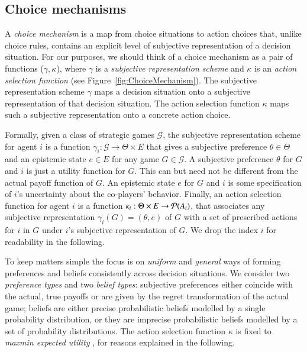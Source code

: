 \documentclass[fleqn,reqno,11pt]{article}
\begin{document}
\subsection{Choice mechanisms}
\label{sec:choice-mechanisms}

A \emph{choice mechanism} is a map from choice situations to action choices that, unlike choice
rules, contains an explicit level of subjective representation of a decision situation. For our
purposes, we should think of a choice mechanism as a pair of functions ($\gamma,\kappa$), where
$\gamma$ is a \emph{subjective representation scheme} and $\kappa$ is an \emph{action selection
  function} (see Figure~\ref{fig:ChoiceMechanism}). The subjective representation scheme
$\gamma$ maps a decision situation onto a subjective representation of that decision
situation. The action selection function $\kappa$ maps such a subjective representation onto a
concrete action choice. 



Formally, given a class of strategic games $\mathcal{G}$, the subjective representation scheme
for agent $i$ is a function $\gamma_i: \mathcal{G} \rightarrow \Theta \times E$ that gives a
subjective preference $\theta \in \Theta$ and an epistemic state $e \in E$ for any game
$G \in \mathcal{G}$. A subjective preference $\theta$ for $G$ and $i$ is just a utility
function for $G$. This can but need not be different from the actual payoff function of $G$. An
epistemic state $e$ for $G$ and $i$ is some specification of $i$'s uncertainty about the
co-players' behavior. Finally, an action selection function for agent $i$ is a function
$\kappa_i: \Theta \times E \rightarrow \mathcal{P}(A_i) $, that associates any subjective
representation $\gamma_i(G) = (\theta,e)$ of $G$ with a set of prescribed actions
for $i$ in $G$ under $i$'s subjective representation of $G$. We drop the index $i$ for
readability in the following.

To keep matters simple the focus is on \emph{uniform} and \emph{general} ways of forming
preferences and beliefs consistently across decision situations. We consider two
\emph{preference types} and two \emph{belief types}: subjective preferences either coincide
with the actual, true payoffs or are given by the regret transformation of the actual game;
beliefs are either precise probabilistic beliefs modelled by a single probability distribution,
or they are imprecise probabilistic beliefs modelled by a set of probability distributions. The
action selection function $\kappa$ is fixed to \textit{maxmin expected utility}
\citep{gilsch89}, for reasons explained in the following.
\end{document}
